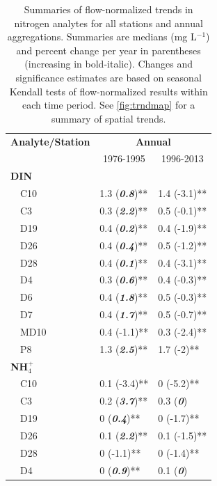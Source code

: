\documentclass[journal = esthag, manuscript = article]{achemso}\usepackage[]{graphicx}\usepackage[]{color}
\begin{document}
\begin{table}[!tbp]
\caption{Summaries of flow-normalized trends in nitrogen analytes for all stations and annual aggregations.  Summaries are  medians (mg L$^{-1}$) and percent change per year in parentheses (increasing in bold-italic). Changes and significance estimates are based on seasonal Kendall tests of flow-normalized results within each time period. See \cref{fig:trndmap} for a summary of spatial trends.\label{tab:trndsann}} 
\begin{center}
\begin{tabular}{lll}
\hline\hline
\multicolumn{1}{l}{\bfseries Analyte/Station}&\multicolumn{2}{c}{\bfseries Annual}\tabularnewline
\cline{2-3}
\multicolumn{1}{l}{}&\multicolumn{1}{c}{1976-1995}&\multicolumn{1}{c}{1996-2013}\tabularnewline
\hline
{\bfseries DIN}&&\tabularnewline
~~C10&1.3 \footnotesize{(\textit{\textbf{0.8}})**}&1.4 \footnotesize{(-3.1)**}\tabularnewline
~~C3&0.3 \footnotesize{(\textit{\textbf{2.2}})**}&0.5 \footnotesize{(-0.1)**}\tabularnewline
~~D19&0.4 \footnotesize{(\textit{\textbf{0.2}})**}&0.4 \footnotesize{(-1.9)**}\tabularnewline
~~D26&0.4 \footnotesize{(\textit{\textbf{0.4}})**}&0.5 \footnotesize{(-1.2)**}\tabularnewline
~~D28&0.4 \footnotesize{(\textit{\textbf{0.1}})**}&0.4 \footnotesize{(-3.1)**}\tabularnewline
~~D4&0.3 \footnotesize{(\textit{\textbf{0.6}})**}&0.4 \footnotesize{(-0.3)**}\tabularnewline
~~D6&0.4 \footnotesize{(\textit{\textbf{1.8}})**}&0.5 \footnotesize{(-0.3)**}\tabularnewline
~~D7&0.4 \footnotesize{(\textit{\textbf{1.7}})**}&0.5 \footnotesize{(-0.7)**}\tabularnewline
~~MD10&0.4 \footnotesize{(-1.1)**}&0.3 \footnotesize{(-2.4)**}\tabularnewline
~~P8&1.3 \footnotesize{(\textit{\textbf{2.5}})**}&1.7 \footnotesize{(-2)**}\tabularnewline
\hline
{\bfseries NH$_{4}^{+}$}&&\tabularnewline
~~C10&0.1 \footnotesize{(-3.4)**}&0 \footnotesize{(-5.2)**}\tabularnewline
~~C3&0.2 \footnotesize{(\textit{\textbf{3.7}})**}&0.3 \footnotesize{(\textit{\textbf{0}})}\tabularnewline
~~D19&0 \footnotesize{(\textit{\textbf{0.4}})**}&0 \footnotesize{(-1.7)**}\tabularnewline
~~D26&0.1 \footnotesize{(\textit{\textbf{2.2}})**}&0.1 \footnotesize{(-1.5)**}\tabularnewline
~~D28&0 \footnotesize{(-1.1)**}&0 \footnotesize{(-1.4)**}\tabularnewline
~~D4&0 \footnotesize{(\textit{\textbf{0.9}})**}&0.1 \footnotesize{(\textit{\textbf{0}})}\tabularnewline

\end{tabular}
\end{center}
\end{table}
\end{document}
